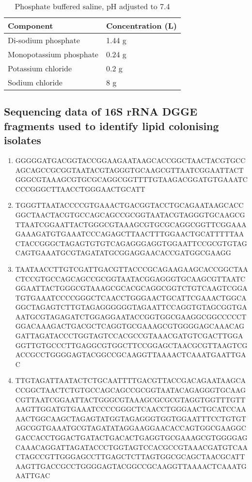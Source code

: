 \documentclass[11pt]{article}
\begin{document}
\begin{table}
\caption{Phosphate buffered saline, pH adjusted to 7.4}
\begin{tabular}{  p{6.9cm} | p{6.9cm}  }
\hline
Component & Concentration (L) \\
\hline
Di-sodium phosphate  & 1.44 g \\
  Monopotassium phosphate  & 0.24 g  \\
    Potassium chloride  &  0.2 g  \\
      Sodium chloride  & 8 g  \\
  \hline
\end{tabular}
\end{table}

\subsection{Sequencing data of 16S rRNA DGGE fragments used to identify lipid colonising isolates}
\begin{enumerate}
\item GGGGGATGACGGTACCGGAAGAATAAGCACCGGCTAACTACGTGCCAGCAGCCGCGGTAATACGTAGGGTGCAAGCGTTAATCGGAATTACTGGGCGTAAAGCGTGCGCAGGCGGTTTTGTAAGACGGATGTGAAATCCCCGGGCTTAACCTGGGAACTGCATT
\item TGGGTTAATACCCCGTGAAACTGACGGTACCTGCAGAATAAGCACCGGCTAACTACGTGCCAGCAGCCGCGGTAATACGTAGGGTGCAAGCGTTAATCGGAATTACTGGGCGTAAAGCGTGCGCAGGCGGTTCGGAAAGAAAGATGTGAAATCCCAGAGCTTAACTTTGGAACTGCATTTTTAACTACCGGGCTAGAGTGTGTCAGAGGGAGGTGGAATTCCGCGTGTAGCAGTGAAATGCGTAGATATGCGGAGGAACACCGATGGCGAAGG
\item TAATAACCTTGTCGATTGACGTTACCCGCAGAAGAAGCACCGGCTAACTCCGTGCCAGCAGCCGCGGTAATACGGAGGGTGCAAGCGTTAATCGGAATTACTGGGCGTAAAGCGCACGCAGGCGGTCTGTCAAGTCGGATGTGAAATCCCCGGGCTCAACCTGGGAACTGCATTCGAAACTGGCAGGCTAGAGTCTTGTAGAGGGGGGTAGAATTCCAGGTGTAGCGGTGAAATGCGTAGAGATCTGGAGGAATACCGGTGGCGAAGGCGGCCCCCTGGACAAAGACTGACGCTCAGGTGCGAAAGCGTGGGGAGCAAACAGGATTAGATACCCTGGTAGTCCACGCCGTAAACGATGTCGACTTGGAGGTTGTGCCCTTGAGGCGTGGCTTCCGGAGCTAACGCGTTAAGTCGACCGCCTGGGGAGTACGGCCGCAAGGTTAAAACTCAAATGAATTGAC
\item TTGTAGATTAATACTCTGCAATTTTGACGTTACCGACAGAATAAGCACCGGCTAACTCTGTGCCAGCAGCCGCGGTAATACAGAGGGTGCAAGCGTTAATCGGAATTACTGGGCGTAAAGCGCGCGTAGGTGGTTTGTTAAGTTGGATGTGAAATCCCCGGGCTCAACCTGGGAACTGCATCCAAAACTGGCAAGCTAGAGTATGGTAGAGGGTGGTGGAATTTCCTGTGTAGCGGTGAAATGCGTAGATATAGGAAGGAACACCAGTGGCGAAGGCGACCACCTGGACTGATACTGACACTGAGGTGCGAAAGCGTGGGGAGCAAACAGGATTAGATACCCTGGTAGTCCACGCCGTAAACGATGTCAACTAGCCGTTGGGAGCCTTGAGCTCTTAGTGGCGCAGCTAACGCATTAAGTTGACCGCCTGGGGAGTACGGCCGCAAGGTTAAAACTCAAATGAATTGAC
\end{enumerate}
\end{document}
